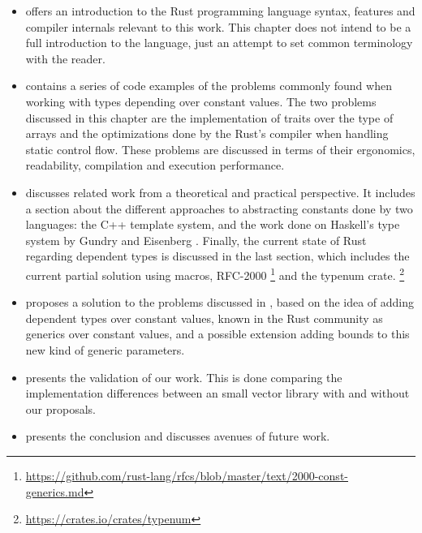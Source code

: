 \begin{itemize}
    \item {} offers an introduction to the Rust
        programming language syntax, features and compiler internals relevant
        to this work. This chapter does not intend to be a full introduction to
        the language, just an attempt to set common terminology with the
        reader.
    \item {} contains a series of code examples of the
        problems commonly found when working with types depending over constant
        values. The two problems discussed in this chapter are the
        implementation of traits over the type of arrays and the optimizations
        done by the Rust's compiler when handling static control flow. These
        problems are discussed in terms of their ergonomics, readability,
        compilation and execution performance.
    \item {} discusses related work from a theoretical
        and practical perspective. It includes a section about the
        different approaches to abstracting constants done by two languages:
        the C++ template system, and the work done on Haskell's type system by
        Gundry \cite{gundry} and Eisenberg \cite{eisenberg}. Finally, the
        current state of Rust regarding dependent types is discussed in the
        last section, which includes the current partial solution using macros,
        RFC-2000
        \footnote{\url{https://github.com/rust-lang/rfcs/blob/master/text/2000-const-generics.md}}
        and the typenum crate.
        \footnote{\url{https://crates.io/crates/typenum}}
    \item {} proposes a solution to the problems discussed in
        , based on the idea of adding dependent types
        over constant values, known in the Rust community as generics over
        constant values, and a possible extension adding bounds to this new
        kind of generic parameters.

    \item {} presents the validation of our work. This is done
        comparing the implementation differences between an small vector
        library with and without our proposals.

    \item {} presents the conclusion and discusses avenues of future
        work.
\end{itemize}
